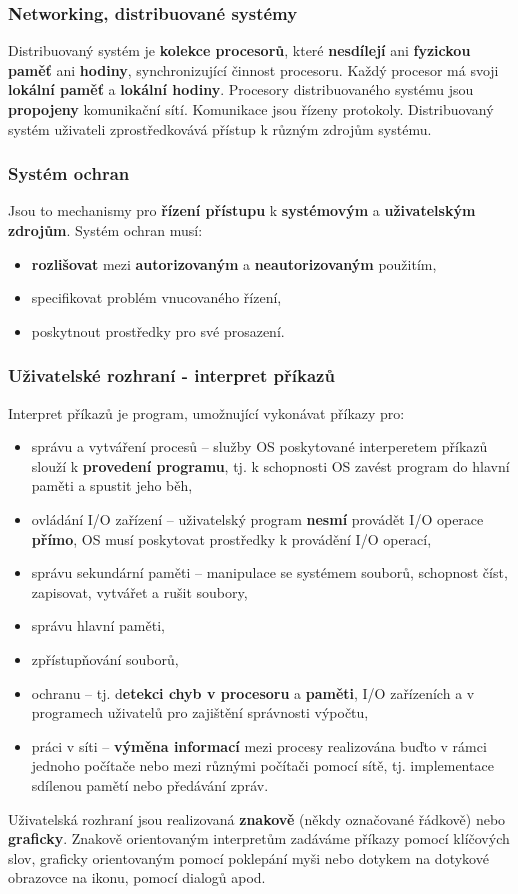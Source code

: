 \subsubsection{Networking, distribuované systémy}
Distribuovaný systém je \textbf{kolekce procesorů}, které \textbf{nesdílejí} ani \textbf{fyzickou paměť} ani \textbf{hodiny}, synchronizující činnost procesoru. Každý procesor má svoji \textbf{lokální paměť} a \textbf{lokální hodiny}. Procesory distribuovaného systému jsou \textbf{propojeny} komunikační sítí. Komunikace jsou řízeny protokoly. Distribuovaný systém uživateli zprostředkovává přístup k různým zdrojům systému.

\subsubsection{Systém ochran}
Jsou to mechanismy pro \textbf{řízení přístupu} k \textbf{systémovým} a \textbf{uživatelským zdrojům}. Systém ochran musí:
\begin{itemize}
	\item \textbf{rozlišovat} mezi \textbf{autorizovaným} a \textbf{neautorizovaným} použitím,
	\item specifikovat problém vnucovaného řízení,
	\item poskytnout prostředky pro své prosazení.
\end{itemize}

\subsubsection{Uživatelské rozhraní - interpret příkazů}
Interpret příkazů je program, umožnující vykonávat příkazy pro:
\begin{itemize}
	\item správu a vytváření procesů -- služby OS poskytované interperetem příkazů slouží k \textbf{provedení programu}, tj. k schopnosti OS zavést program do hlavní paměti a spustit jeho běh,
	\item ovládání I/O zařízení -- uživatelský program \textbf{nesmí} provádět I/O operace \textbf{přímo}, OS musí poskytovat prostředky k provádění I/O operací,
	\item správu sekundární paměti -- manipulace se systémem souborů, schopnost číst, zapisovat, vytvářet a rušit soubory,
	\item správu hlavní paměti,
	\item zpřístupňování souborů,
	\item ochranu -- tj. d\textbf{etekci chyb v procesoru} a \textbf{paměti}, I/O zařízeních a v programech uživatelů pro zajištění správnosti výpočtu,
	\item práci v síti -- \textbf{výměna informací} mezi procesy realizována buďto v rámci jednoho počítače nebo mezi různými počítači pomocí sítě, tj. implementace sdílenou pamětí nebo předávání zpráv.
\end{itemize}
Uživatelská rozhraní jsou realizovaná \textbf{znakově} (někdy označované řádkově) nebo \textbf{graficky}. Znakově orientovaným interpretům zadáváme příkazy pomocí klíčových slov, graficky orientovaným pomocí poklepání myši nebo dotykem na dotykové obrazovce na ikonu, pomocí dialogů apod.

